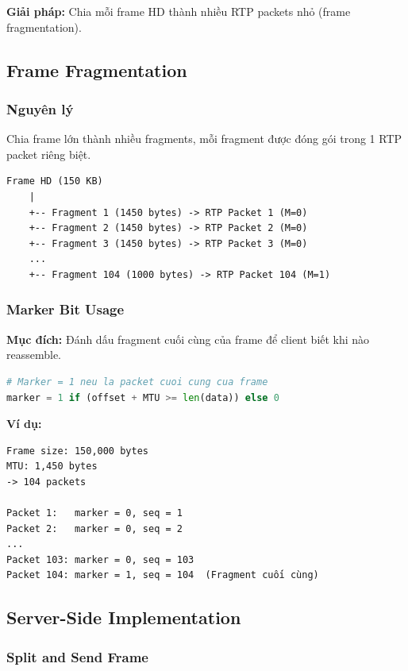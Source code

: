 \documentclass[a4paper,12pt]{article}
\begin{document}
\textbf{Giải pháp:} Chia mỗi frame HD thành nhiều RTP packets nhỏ (frame fragmentation).

\subsection{Frame Fragmentation}

\subsubsection{Nguyên lý}

Chia frame lớn thành nhiều fragments, mỗi fragment được đóng gói trong 1 RTP packet riêng biệt.

\begin{verbatim}
Frame HD (150 KB)
    |
    +-- Fragment 1 (1450 bytes) -> RTP Packet 1 (M=0)
    +-- Fragment 2 (1450 bytes) -> RTP Packet 2 (M=0)
    +-- Fragment 3 (1450 bytes) -> RTP Packet 3 (M=0)
    ...
    +-- Fragment 104 (1000 bytes) -> RTP Packet 104 (M=1)
\end{verbatim}

\subsubsection{Marker Bit Usage}

\textbf{Mục đích:} Đánh dấu fragment cuối cùng của frame để client biết khi nào reassemble.

\begin{lstlisting}[language=Python, caption={Marker Bit Logic}]
# Marker = 1 neu la packet cuoi cung cua frame
marker = 1 if (offset + MTU >= len(data)) else 0
\end{lstlisting}

\textbf{Ví dụ:}
\begin{verbatim}
Frame size: 150,000 bytes
MTU: 1,450 bytes
-> 104 packets

Packet 1:   marker = 0, seq = 1
Packet 2:   marker = 0, seq = 2
...
Packet 103: marker = 0, seq = 103
Packet 104: marker = 1, seq = 104  (Fragment cuối cùng)
\end{verbatim}

\subsection{Server-Side Implementation}

\subsubsection{Split and Send Frame}
\end{document}
